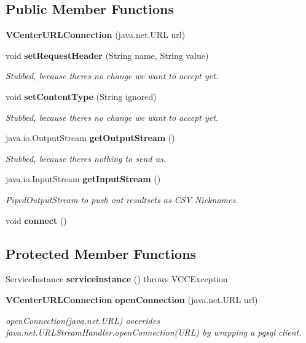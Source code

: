 \subsection*{Public Member Functions}
\begin{DoxyCompactItemize}
\item 
{\bf V\+Center\+U\+R\+L\+Connection} (java.\+net.\+U\+R\+L url)
\item 
void {\bf set\+Request\+Header} (String name, String value)
\begin{DoxyCompactList}\small\item\em Stubbed, because there\textquotesingle{}s no change we want to accept yet. \end{DoxyCompactList}\item 
void {\bf set\+Content\+Type} (String ignored)
\begin{DoxyCompactList}\small\item\em Stubbed, because there\textquotesingle{}s no change we want to accept yet. \end{DoxyCompactList}\item 
java.\+io.\+Output\+Stream {\bf get\+Output\+Stream} ()
\begin{DoxyCompactList}\small\item\em Stubbed, because there\textquotesingle{}s nothing to send us. \end{DoxyCompactList}\item 
java.\+io.\+Input\+Stream {\bf get\+Input\+Stream} ()
\begin{DoxyCompactList}\small\item\em Piped\+Output\+Stream to push out resultsets as C\+S\+V Nicknames. \end{DoxyCompactList}\item 
void {\bf connect} ()
\end{DoxyCompactItemize}
\subsection*{Protected Member Functions}
\begin{DoxyCompactItemize}
\item 
Service\+Instance {\bf serviceinstance} ()  throws V\+C\+C\+Exception     
\item 
{\bf V\+Center\+U\+R\+L\+Connection} {\bf open\+Connection} (java.\+net.\+U\+R\+L url)
\begin{DoxyCompactList}\small\item\em open\+Connection(java.\+net.\+U\+R\+L) overrides java.\+net.\+U\+R\+L\+Stream\+Handler.\+open\+Connection(\+U\+R\+L) by wrapping a pgsql client. \end{DoxyCompactList}\end{DoxyCompactItemize}
